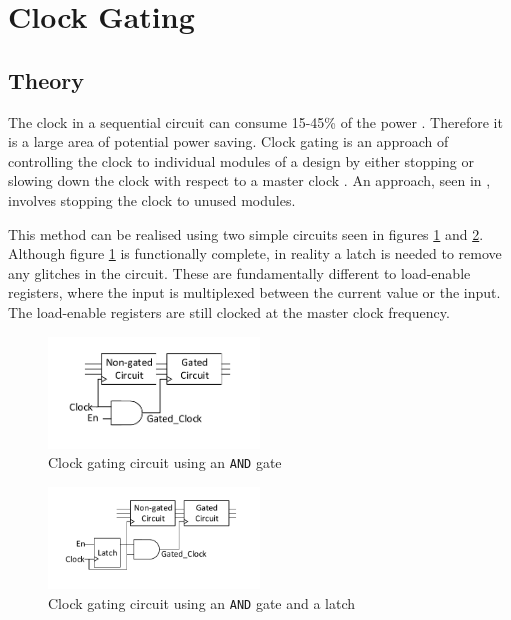 
\section{Clock Gating}

\subsection{Theory}

The clock in a sequential circuit can consume 15-45\% of the power \cite{pedram1996power}.
Therefore it is a large area of potential power saving.
Clock gating is an approach of controlling the clock to individual modules of a design by either stopping or slowing down the clock with respect to a master clock \cite{841927}. 
An approach, seen in \cite{tellez1995activity}, involves stopping the clock to unused modules.

This method can be realised using two simple circuits seen in figures \ref{fig:cg:circuit1} and \ref{fig:cg:circuit2}.
Although figure \ref{fig:cg:circuit1} is functionally complete, in reality a latch is needed to remove any glitches in the circuit.
These are fundamentally different to load-enable registers, where the input is multiplexed between the current value or the input.
The load-enable registers are still clocked at the master clock frequency.

\begin{figure}[t]
\centering
\includegraphics[width=0.5\textwidth]{Figures/clockgating_and.pdf}
\caption{Clock gating circuit using an \texttt{AND} gate}
\label{fig:cg:circuit1}
\end{figure}

\begin{figure}[b]
\includegraphics[width=0.5\textwidth]{Figures/clockgating_latch.pdf}
\caption{Clock gating circuit using an \texttt{AND} gate and a latch}
\label{fig:cg:circuit2}
\end{figure}

